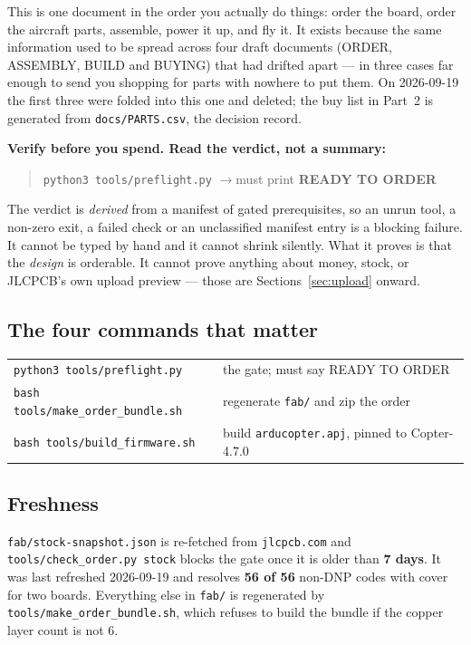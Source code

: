 \documentclass[11pt,a4paper]{article}
\newcommand{\file}[1]{\texttt{\small #1}}
\newcommand{\cmd}[1]{\texttt{\small #1}}
\newcommand{\good}[1]{\textcolor{okgreen}{\textbf{#1}}}
\begin{document}
This is one document in the order you actually do things: order the board, order the
aircraft parts, assemble, power it up, and fly it. It exists because the same information
used to be spread across four draft documents (ORDER, ASSEMBLY, BUILD and BUYING) that had
drifted apart --- in three cases far enough to send you shopping for parts with nowhere to
put them. On 2026-09-19 the first three were folded into this one and deleted;
the buy list in Part~2 is generated from \file{docs/PARTS.csv}, the decision record.

\textbf{Verify before you spend. Read the verdict, not a summary:}

\begin{quote}
\cmd{python3 tools/preflight.py} \quad$\rightarrow$\quad must print \good{READY TO ORDER}
\end{quote}

The verdict is \emph{derived} from a manifest of gated prerequisites, so an unrun tool,
a non-zero exit, a failed check or an unclassified manifest entry is a blocking failure.
It cannot be typed by hand and it cannot shrink silently. What it proves is that the
\emph{design} is orderable. It cannot prove anything about money, stock, or JLCPCB's own
upload preview --- those are Sections~\ref{sec:upload} onward.

\subsection{The four commands that matter}

\begin{center}
\begin{tabular}{@{}ll@{}}
\toprule
\cmd{python3 tools/preflight.py} & the gate; must say READY TO ORDER \\
\cmd{bash tools/make\_order\_bundle.sh} & regenerate \file{fab/} and zip the order \\
\cmd{bash tools/build\_firmware.sh} & build \file{arducopter.apj}, pinned to Copter-4.7.0 \\
\bottomrule
\end{tabular}
\end{center}

\subsection{Freshness}

\file{fab/stock-snapshot.json} is re-fetched from \file{jlcpcb.com} and
\file{tools/check\_order.py stock} blocks the gate once it is older than \textbf{7 days}. It was
last refreshed 2026-09-19 and resolves \textbf{56 of 56} non-DNP codes with cover for two
boards. Everything else in \file{fab/} is regenerated by
\file{tools/make\_order\_bundle.sh}, which refuses to build the bundle if the copper layer
count is not 6.
\end{document}
